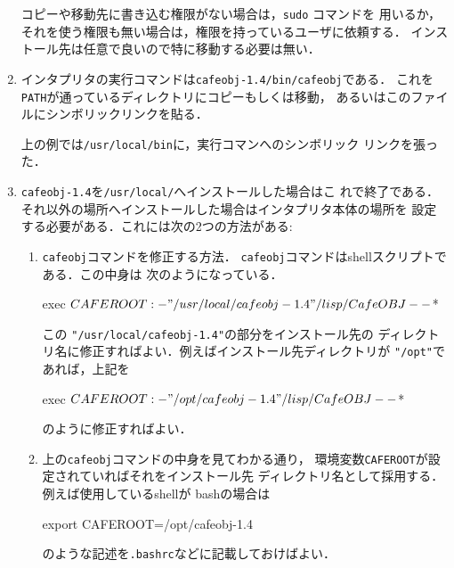 \begin{enumerate}
  コピーや移動先に書き込む権限がない場合は，\texttt{sudo} コマンドを
  用いるか，それを使う権限も無い場合は，権限を持っているユーザに依頼する．
  インストール先は任意で良いので特に移動する必要は無い．

\item インタプリタの実行コマンドは\texttt{cafeobj-1.4/bin/cafeobj}である．
  これを\texttt{PATH}が通っているディレクトリにコピーもしくは移動，
  あるいはこのファイルにシンボリックリンクを貼る．
  \begin{vvtm}
    \begin{examplev}
  \end{examplev}
  \end{vvtm}
  上の例では\texttt{/usr/local/bin}に，実行コマンへのシンボリック
  リンクを張った．
\item  \texttt{cafeobj-1.4}を\texttt{/usr/local/}へインストールした場合はこ
  れで終了である．
  それ以外の場所へインストールした場合はインタプリタ本体の場所を
  設定する必要がある．これには次の2つの方法がある:
  \begin{enumerate}
  \item \texttt{cafeobj}コマンドを修正する方法．
    \texttt{cafeobj}コマンドはshellスクリプトである．この中身は
    次のようになっている．
    \begin{vvtm}
      \begin{simplev}
        exec ${CAFEROOT:-"/usr/local/cafeobj-1.4"}/lisp/CafeOBJ -- $*
      \end{simplev}
    \end{vvtm}
    この \texttt{"/usr/local/cafeobj-1.4"}の部分をインストール先の
    ディレクトリ名に修正すればよい．例えばインストール先ディレクトリが
    \texttt{"/opt"}であれば，上記を
    \begin{vvtm}
      \begin{simplev}
        exec ${CAFEROOT:-"/opt/cafeobj-1.4"}/lisp/CafeOBJ -- $*
      \end{simplev}
    \end{vvtm}
    のように修正すればよい．
  \item 上の\texttt{cafeobj}コマンドの中身を見てわかる通り，
    環境変数\texttt{CAFEROOT}が設定されていればそれをインストール先
    ディレクトリ名として採用する．例えば使用しているshellが
    bashの場合は
    \begin{vvtm}
      \begin{simplev}
        export CAFEROOT=/opt/cafeobj-1.4
      \end{simplev}
    \end{vvtm}
    のような記述を\texttt{.bashrc}などに記載しておけばよい．
  \end{enumerate}
  
\end{enumerate}

